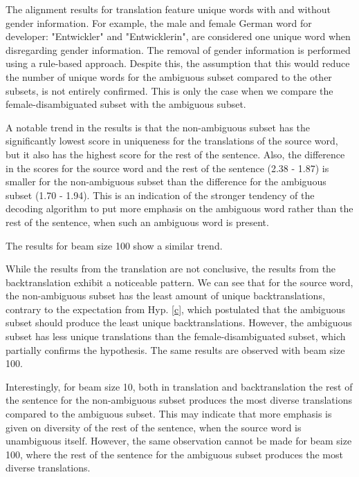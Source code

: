 
The alignment results for translation feature unique words with and without gender information. For example, the male and female German word for developer: "Entwickler" and "Entwicklerin", are considered one unique word when disregarding gender information. The removal of gender information is performed using a rule-based approach. Despite this, the assumption that this would reduce the number of unique words for the ambiguous subset compared to the other subsets, is not entirely confirmed. This is only the case when we compare the female-disambiguated subset with the ambiguous subset.


A notable trend in the results is that the non-ambiguous subset has the significantly lowest score in uniqueness for the translations of the source word, but it also has the highest score for the rest of the sentence. Also, the difference in the scores for the source word and the rest of the sentence (2.38 - 1.87) is smaller for the non-ambiguous subset than the difference for the ambiguous subset (1.70 - 1.94). This is an indication of the stronger tendency of the decoding algorithm to put more emphasis on the ambiguous word rather than the rest of the sentence, when such an ambiguous word is present.

The results for beam size 100 show a similar trend.

While the results from the translation are not conclusive, the results from the backtranslation exhibit a noticeable pattern. We can see that for the source word, the non-ambiguous subset has the least amount of unique backtranslations, contrary to the expectation from Hyp. \ref{c}, which postulated that the ambiguous subset should produce the least unique backtranslations. However, the ambiguous subset has less unique translations than the female-disambiguated subset, which partially confirms the hypothesis. The same results are observed with beam size 100.

Interestingly, for beam size 10, both in translation and backtranslation the rest of the sentence for the non-ambiguous subset produces the most diverse translations compared to the ambiguous subset. This may indicate that more emphasis is given on diversity of the rest of the sentence, when the source word is unambiguous itself. However, the same observation cannot be made for beam size 100, where the rest of the sentence for the ambiguous subset produces the most diverse translations.

